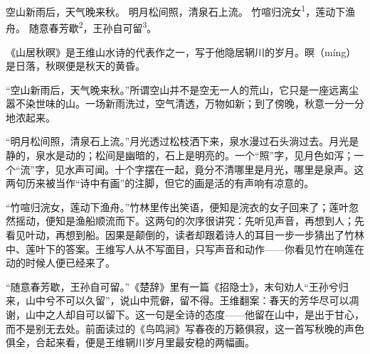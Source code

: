 
\begin{poem}
空山新雨后，天气晚来秋。
明月松间照，清泉石上流。
竹喧归浣女\textsuperscript{1}，莲动下渔舟。
随意春芳歇\textsuperscript{2}，王孙自可留\textsuperscript{3}。
\end{poem}

\begin{annotations}
\end{annotations}

\begin{appreciation}
《山居秋暝》是王维山水诗的代表作之一，写于他隐居辋川的岁月。暝（míng）是日落，秋暝便是秋天的黄昏。

“空山新雨后，天气晚来秋。”所谓空山并不是空无一人的荒山，它只是一座远离尘嚣不染世味的山。一场新雨洗过，空气清透，万物如新；到了傍晚，秋意一分一分地浓起来。

“明月松间照，清泉石上流。”月光透过松枝洒下来，泉水漫过石头淌过去。月光是静的，泉水是动的；松间是幽暗的，石上是明亮的。一个“照”字，见月色如泻；一个“流”字，见水声可闻。十个字摆在一起，竟分不清哪里是月光，哪里是泉声。这两句历来被当作“诗中有画”的注脚，但它的画是活的有声响有凉意的。

“竹喧归浣女，莲动下渔舟。”竹林里传出笑语，便知是浣衣的女子回来了；莲叶忽然摇动，便知是渔船顺流而下。这两句的次序很讲究：先听见声音，再想到人；先看见叶动，再想到船。因果是颠倒的，读者却跟着诗人的耳目一步一步猜出了竹林中、莲叶下的答案。王维写人从不写面目，只写声音和动作——你看见竹在响莲在动的时候人便已经来了。

“随意春芳歇，王孙自可留。”《楚辞》里有一篇《招隐士》，末句劝人“王孙兮归来，山中兮不可以久留”，说山中荒僻，留不得。王维翻案：春天的芳华尽可以凋谢，山中之人却自可以留下。这一句是全诗的态度——他留在山中，是出于甘心，而不是别无去处。前面读过的《鸟鸣涧》写春夜的万籁俱寂，这一首写秋晚的声色俱全，合起来看，便是王维辋川岁月里最安稳的两幅画。
\end{appreciation}
